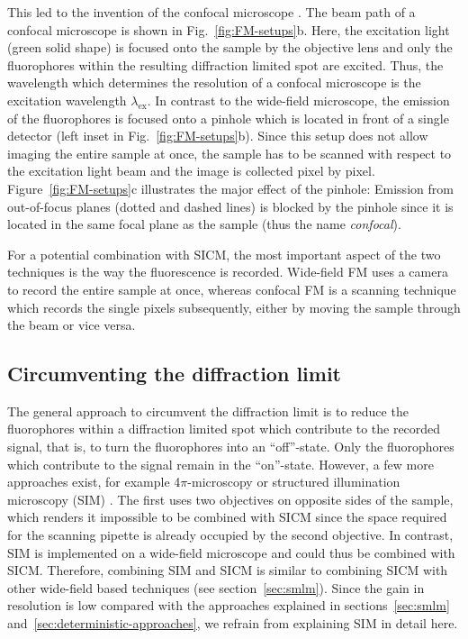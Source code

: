 This led to the invention of the confocal microscope
\cite{Heimstaedt1911,Minsky1988}. The beam path of a confocal microscope is
shown in Fig.~\ref{fig:FM-setups}b. Here, the excitation light (green solid
shape) is focused onto the sample by the objective lens and only the
fluorophores within the resulting diffraction limited spot are excited. Thus, the
wavelength which determines the resolution of a confocal microscope is the
excitation wavelength $\lambda_\text{ex}$. In contrast to the wide-field
microscope, the emission of the fluorophores is focused onto a pinhole which
is located in front of a single detector (left inset in
Fig.~\ref{fig:FM-setups}b). Since this setup does not allow imaging the entire
sample at once, the sample has to be scanned with respect to the excitation
light beam and the image is collected pixel by
pixel. Figure~\ref{fig:FM-setups}c illustrates the major effect of the pinhole:
Emission from out-of-focus planes (dotted and dashed lines) is blocked by the
pinhole since it is located in the same focal plane as the sample (thus the
name \emph{confocal}). 

For a potential combination with SICM, the most important aspect of the two
techniques is the way the fluorescence is recorded. Wide-field FM uses a 
camera to record the entire sample at once, whereas confocal FM is a scanning
technique which records the single pixels subsequently, either by moving the
sample through the beam or vice versa.

\subsection{Circumventing the diffraction limit}
\label{sec:circumvent-diffraction-limit}
The general approach to circumvent the diffraction limit is to reduce the
fluorophores within a diffraction limited spot which contribute to the
recorded signal, that is, to turn the fluorophores into an ``off''-state. Only
the fluorophores which contribute to the signal remain in the ``on''-state.
However, a few more approaches exist, for example 4$\pi$-microscopy
\cite{Hell1994} or structured illumination microscopy (SIM)
\cite{Guerra1995}. The first uses two objectives on opposite sides of the
sample, which renders it impossible to be combined with SICM since the space
required for the scanning pipette is already occupied by the second
objective. In contrast, SIM is implemented on a wide-field microscope and
could thus be combined with SICM. Therefore, combining SIM and SICM is similar
to combining SICM with other wide-field based techniques (see
section~\ref{sec:smlm}). Since the gain in resolution is low compared with the
approaches explained in sections~\ref{sec:smlm}
and~\ref{sec:deterministic-approaches}, we refrain from explaining SIM in
detail here.


